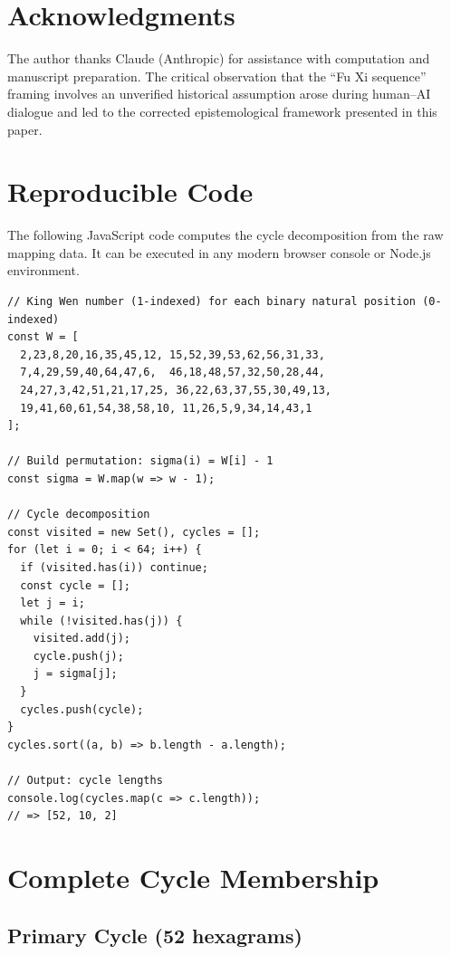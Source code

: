 \documentclass[11pt,a4paper]{article}
\begin{document}
\section*{Acknowledgments}
The author thanks Claude (Anthropic) for assistance with computation and manuscript preparation.
The critical observation that the ``Fu Xi sequence'' framing involves an unverified historical assumption arose during human--AI dialogue and led to the corrected epistemological framework presented in this paper.


\appendix
\section{Reproducible Code}\label{app:code}

The following JavaScript code computes the cycle decomposition from the raw mapping data.
It can be executed in any modern browser console or Node.js environment.

\begin{lstlisting}[caption={Cycle decomposition of $\sigma$.}]
// King Wen number (1-indexed) for each binary natural position (0-indexed)
const W = [
  2,23,8,20,16,35,45,12, 15,52,39,53,62,56,31,33,
  7,4,29,59,40,64,47,6,  46,18,48,57,32,50,28,44,
  24,27,3,42,51,21,17,25, 36,22,63,37,55,30,49,13,
  19,41,60,61,54,38,58,10, 11,26,5,9,34,14,43,1
];

// Build permutation: sigma(i) = W[i] - 1
const sigma = W.map(w => w - 1);

// Cycle decomposition
const visited = new Set(), cycles = [];
for (let i = 0; i < 64; i++) {
  if (visited.has(i)) continue;
  const cycle = [];
  let j = i;
  while (!visited.has(j)) {
    visited.add(j);
    cycle.push(j);
    j = sigma[j];
  }
  cycles.push(cycle);
}
cycles.sort((a, b) => b.length - a.length);

// Output: cycle lengths
console.log(cycles.map(c => c.length));
// => [52, 10, 2]
\end{lstlisting}


\section{Complete Cycle Membership}\label{app:cycles}

\subsection*{Primary Cycle (52 hexagrams)}
\end{document}
